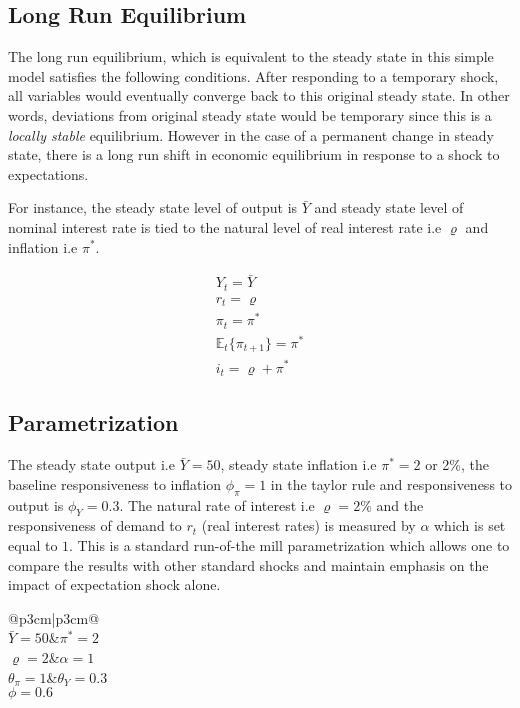 \documentclass[12pt]{article}
\makeatletter
\newcommand\Taccount[3][3cm]%
{{\renewcommand\arraystretch{1.3}%
		\begin{adjustbox}{width=0.4\textwidth}
		\begin{tabular}[t]{@{}p{#1}|p{#1}@{}}
			\multicolumn{2}{@{}c@{}}{#2}\\
			\hline
			\hline
			#3
		\end{tabular}%
		\end{adjustbox}
	
}}
\newcommand{\1}{\mathbbm 1}
\renewcommand{\rho}{\varrho}
\makeatother
\begin{document}
	
		\subsection{Long Run Equilibrium}
		
		The long run equilibrium, which is equivalent to the steady state in this simple model satisfies the following conditions. After responding to a temporary shock, all variables would eventually converge back to this original steady state. In other words, deviations from original steady state would be temporary since this is a \textit{locally stable} equilibrium. However in the case of a permanent change in steady state, there is a long run shift in economic equilibrium in response to a shock to expectations.
		
		For instance, the steady state level of output is $\bar{Y}$ and steady state level of nominal interest rate is tied to the natural level of real interest rate i.e $\rho$ and inflation i.e $\pi^{*}$.
		
		
		\begin{equation*}
			\begin{split}
			Y_{t} = \bar{Y} \\
			r_{t} = \rho \\
			\pi_{t} = \pi^{*} \\
			\mathbb{E}_{t}\{\pi_{t+1}\} = \pi^{*} \\
			i_{t} = \rho + \pi^{*}
			\end{split}
		\end{equation*}
	
	\subsection{Parametrization}
	
	The steady state output i.e $\bar{Y} = 50$, steady state inflation i.e $\pi^{*} = 2$ or 2\%, the baseline responsiveness to inflation $\phi_{\pi} = 1$ in the taylor rule and responsiveness to output is $\phi_{Y} = 0.3$. The natural rate of interest i.e $\rho = 2\%$ and the responsiveness of demand to $r_{t}$ (real interest rates) is measured by $\alpha$ which is set equal to $1$. This is a standard run-of-the mill parametrization which allows one to compare the results with other standard shocks and maintain emphasis on the impact of expectation shock alone.
	
	
	\begin{center}
		\Taccount{Model Parameters}{$\bar{Y} = 50$&$\pi^{*} = 2$\\$\rho = 2$&$\alpha=1$\\$\theta_{\pi} = 1$&$\theta_{Y} = 0.3$\\$\phi = 0.6$}
	\end{center}
		
\end{document}

